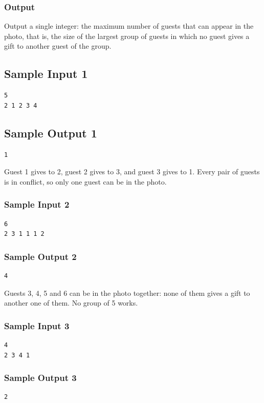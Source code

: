 \documentclass[11pt]{article}
\begin{document}
\subsubsection*{Output}

Output a single integer: the maximum number of guests that can appear in the photo, that is, the size of the largest group of guests in which no guest gives a gift to another guest of the group.


\subsection*{Sample Input 1}
\begin{verbatim}
5
2 1 2 3 4
\end{verbatim}

\subsection*{Sample Output 1}
\begin{verbatim}
1
\end{verbatim}

\noindent Guest 1 gives to 2, guest 2 gives to 3, and guest 3 gives to 1. Every pair of guests is in conflict, so only one guest can be in the photo.

\subsubsection*{Sample Input 2}
\begin{verbatim}
6
2 3 1 1 1 2
\end{verbatim}

\subsubsection*{Sample Output 2}
\begin{verbatim}
4
\end{verbatim}

\noindent Guests 3, 4, 5 and 6 can be in the photo together: none of them gives a gift to another one of them. No group of 5 works.

\subsubsection*{Sample Input 3}
\begin{verbatim}
4
2 3 4 1
\end{verbatim}

\subsubsection*{Sample Output 3}
\begin{verbatim}
2
\end{verbatim}
\end{document}
